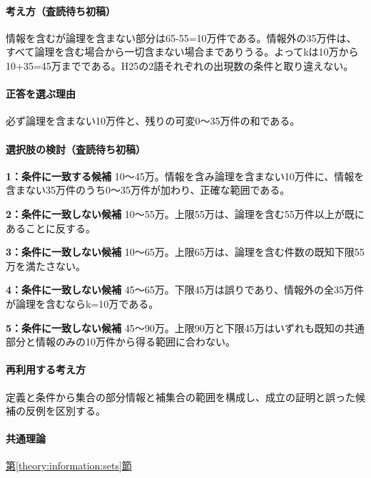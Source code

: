 \paragraph{考え方（査読待ち初稿）} 情報を含むが論理を含まない部分は65-55=\allowbreak{}10万件である。情報外の35万件は、すべて論理を含む場合から一切含まない場合までありうる。よってkは10万から10+35=\allowbreak{}45万までである。H25の2語それぞれの出現数の条件と取り違えない。

\paragraph{正答を選ぶ理由} 必ず論理を含まない10万件と、残りの可変0〜35万件の和である。

\paragraph{選択肢の検討（査読待ち初稿）}\mbox{}\par

\noindent\textbf{1：条件に一致する候補} 10〜45万。情報を含み論理を含まない10万件に、情報を含まない35万件のうち0〜35万件が加わり、正確な範囲である。\par

\noindent\textbf{2：条件に一致しない候補} 10〜55万。上限55万は、論理を含む55万件以上が既にあることに反する。\par

\noindent\textbf{3：条件に一致しない候補} 10〜65万。上限65万は、論理を含む件数の既知下限55万を満たさない。\par

\noindent\textbf{4：条件に一致しない候補} 45〜65万。下限45万は誤りであり、情報外の全35万件が論理を含むならk=\allowbreak{}10万である。\par

\noindent\textbf{5：条件に一致しない候補} 45〜90万。上限90万と下限45万はいずれも既知の共通部分と情報のみの10万件から得る範囲に合わない。\par

\paragraph{再利用する考え方} 定義と条件から集合の部分情報と補集合の範囲を構成し、成立の証明と誤った候補の反例を区別する。

\paragraph{共通理論} \hyperref[theory:information:sets]{第\ref*{theory:information:sets}節}

